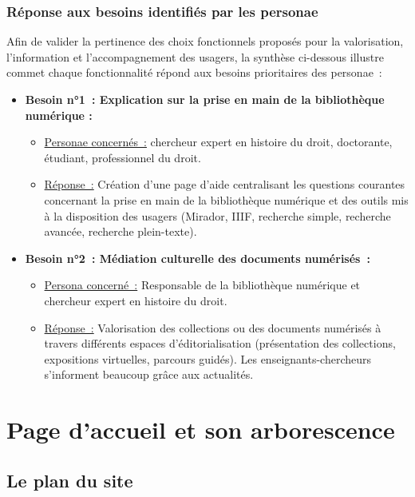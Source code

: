 \subsubsection{Réponse aux besoins identifiés par les personae}

Afin de valider la pertinence des choix fonctionnels proposés pour la valorisation, l’information et l’accompagnement des usagers, la synthèse ci-dessous illustre commet chaque fonctionnalité répond aux besoins prioritaires des personae :
\begin{itemize}
	\item \textbf{Besoin n°1 : Explication sur la prise en main de la bibliothèque numérique :}
\begin{itemize}
	\item \uline{Personae concernés :} chercheur expert en histoire du droit, doctorante, étudiant, professionnel du droit.
\item \uline{Réponse :} Création d’une page d’aide centralisant les questions courantes concernant la prise en main de la bibliothèque numérique et des outils mis à la disposition des usagers (Mirador, IIIF, recherche simple, recherche avancée, recherche plein-texte).
\end{itemize}
\item \textbf{Besoin n°2 : Médiation culturelle des documents numérisés :}
\begin{itemize}
	\item \uline{Persona concerné :} Responsable de la bibliothèque numérique et chercheur expert en histoire du droit.
\item \uline{Réponse :} Valorisation des collections ou des documents numérisés à travers différents espaces d’éditorialisation (présentation des collections, expositions virtuelles, parcours guidés). Les enseignants-chercheurs s’informent beaucoup grâce aux actualités.
\end{itemize}
\end{itemize}

\section[Page d'accueil]{Page d’accueil et son arborescence}
\subsection{Le plan du site}


